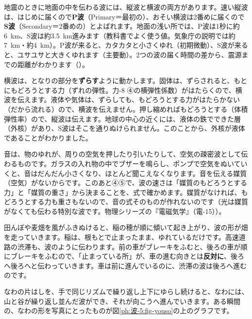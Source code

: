 地震のときに地面の中を伝わる波には、縦波と横波の両方があります。速い縦波は、はじめに届くので\textbf{P波}（Primary＝最初の）、おそい横波は2番めに届くので\textbf{S波}（Secondary＝2番めの）とよばれます。地面の浅い所では、P波は1秒に約\qty{6}{km}、S波は約\qty{3.5}{km}進みます（教科書でよく使う値。気象庁の説明では約\qty{7}{km}・約\qty{4}{km}）。P波が来ると、カタカタと小さくゆれ（初期微動）、S波が来ると、ユサユサと大きくゆれます（主要動）。2つの波の届く時間の差から、震源までの距離がわかります（）。

横波は、となりの部分を\textbf{ずらす}ように動かします。固体は、ずらされると、もとにもどろうとする力（ずれの弾性。力-8 ④の横弾性係数）がはたらくので、横波を伝えます。液体や気体は、ずらしても、もどろうとする力がはたらかない（だから流れる）ので、横波を伝えません。押し縮めればもどろうとする（体積弾性率）ので、縦波は伝えます。地球の中心の近くには、液体の鉄でできた層（外核）があり、S波はそこを通りぬけられません。このことから、外核が液体であることがわかりました。

\label{ph:波-5:baishitsu}音は、物のゆれが、周りの空気を押したり引いたりして、空気の疎密波として伝わるものです。ガラスの入れ物の中でブザーを鳴らし、ポンプで空気をぬいていくと、音はだんだん小さくなり、ほとんど聞こえなくなります。音を伝える媒質（空気）がないからです。このあと④⑤で、波の速さは「媒質のもどろうとする力」と「媒質の重さ」から決まることを、式で確かめます。媒質がなければ、もどろうとする力も重さもないので、音の式そのものが作れないのです（光は媒質がなくても伝わる特別な波です。物理シリーズの『電磁気学』（電-15））。

\begin{phmijika}[身の回りの波]
田んぼや麦畑を風がふきぬけると、稲の穂が順に傾いて起き上がり、波の形が畑を走っていきます。稲は、根もとで止まったまま、ゆれているだけです。高速道路の渋滞も、波のように伝わります。前の車がブレーキをふむと、後ろの車が順にブレーキをふむので、「止まっている所」が、車の進む向きとは\textbf{反対に}、後ろへ後ろへと伝わっていきます。車は前に進んでいるのに、渋滞の波は後ろへ進むのです。
\end{phmijika}

\label{ph:波-5:sec2}
\label{ph:波-5:youso}なわの片はしを、手で同じリズムで繰り返し上下にゆらし続けると、なわには、山と谷が繰り返し並んだ波ができ、それが向こうへ進んでいきます。ある瞬間の、なわの形を写真にとったものが図\ref{ph:波-5:fig-youso}の上のグラフです。

